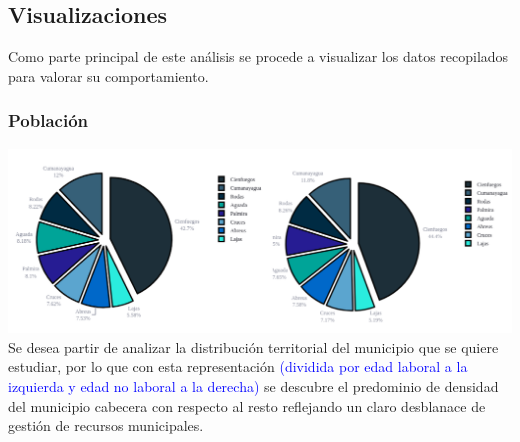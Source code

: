 \documentclass{article}
\begin{document}
\subsection{Visualizaciones}
Como parte principal de este análisis se procede a visualizar los datos recopilados para valorar su comportamiento.

\subsubsection{Población}
\includegraphics[width=1.0\textwidth]{img/fig1.png}
Se desea partir de analizar la distribución territorial del municipio que se quiere estudiar, por lo que con esta representación \textcolor{blue}{(dividida por edad laboral a la izquierda y edad no laboral a la derecha)} se descubre el predominio de densidad del municipio cabecera con respecto al resto reflejando un claro desblanace de gestión de recursos municipales.
\end{document}
